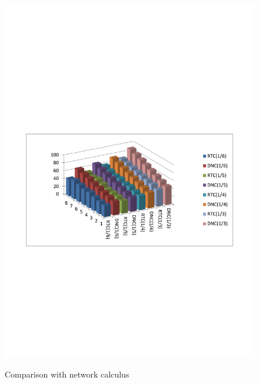 \documentclass[10pt,journal]{IEEEtran}
\begin{document}
\begin{figure}
  \centering
  \includegraphics[scale=0.65]{figures/rtcvsdnc.pdf}\\
  \caption{Comparison with network calculus}\label{comparison}
\end{figure}
\end{document}
